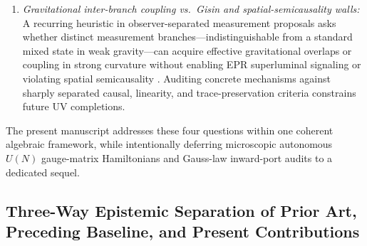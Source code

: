 \documentclass[11pt,a4paper]{article}
\theoremstyle{definition}
\theoremstyle{remark}
\newcommand{\1}{\mathbf{1}}
\begin{document}
\begin{enumerate}
  \item \emph{Gravitational inter-branch coupling vs.\ Gisin and spatial-semicausality walls:} A recurring heuristic in observer-separated measurement proposals asks whether distinct measurement branches---indistinguishable from a standard mixed state in weak gravity---can acquire effective gravitational overlaps or coupling in strong curvature without enabling EPR superluminal signaling \cite{Gisin1990,Polchinski1991} or violating spatial semicausality \cite{Beckman2001}. Auditing concrete mechanisms against sharply separated causal, linearity, and trace-preservation criteria constrains future UV completions.
\end{enumerate}

The present manuscript addresses these four questions within one coherent algebraic framework, while intentionally deferring microscopic autonomous $U(N)$ gauge-matrix Hamiltonians \cite{BFSS1997,IKKT1997} and Gauss-law inward-port audits to a dedicated sequel.

\subsection{Three-Way Epistemic Separation of Prior Art, Preceding Baseline, and Present Contributions}\label{sec:epistemic}
\end{document}
